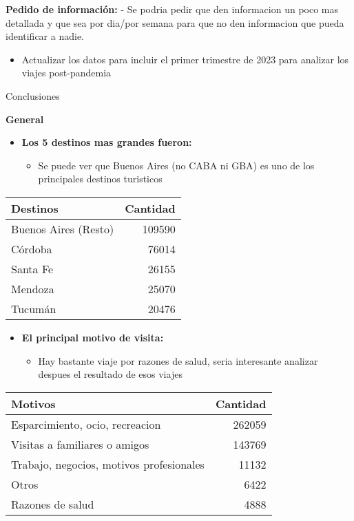 \documentclass[
]{article}
\providecommand{\tightlist}{%
  \setlength{\itemsep}{0pt}\setlength{\parskip}{0pt}}
\begin{document}
\textbf{Pedido de información: } - Se podria pedir que den informacion
un poco mas detallada y que sea por dia/por semana para que no den
informacion que pueda identificar a nadie.

\begin{itemize}
\tightlist
\item
  Actualizar los datos para incluir el primer trimestre de 2023 para
  analizar los viajes post-pandemia
\end{itemize}

\newline

Conclusiones

\textbf{General}

\begin{itemize}
\item
  \textbf{Los 5 destinos mas grandes fueron:}

  \begin{itemize}
  \tightlist
  \item
    Se puede ver que Buenos Aires (no CABA ni GBA) es uno de los
    principales destinos turisticos
  \end{itemize}
\end{itemize}

\begin{longtable}[]{@{}lr@{}}
\toprule()
Destinos & Cantidad \\
\midrule()
\endhead
Buenos Aires (Resto) & 109590 \\
Córdoba & 76014 \\
Santa Fe & 26155 \\
Mendoza & 25070 \\
Tucumán & 20476 \\
\bottomrule()
\end{longtable}

\begin{itemize}
\item
  \textbf{El principal motivo de visita:}

  \begin{itemize}
  \tightlist
  \item
    Hay bastante viaje por razones de salud, seria interesante analizar
    despues el resultado de esos viajes
  \end{itemize}
\end{itemize}

\begin{longtable}[]{@{}lr@{}}
\toprule()
Motivos & Cantidad \\
\midrule()
\endhead
Esparcimiento, ocio, recreacion & 262059 \\
Visitas a familiares o amigos & 143769 \\
Trabajo, negocios, motivos profesionales & 11132 \\
Otros & 6422 \\
Razones de salud & 4888 \\
\bottomrule()
\end{longtable}
\end{document}

